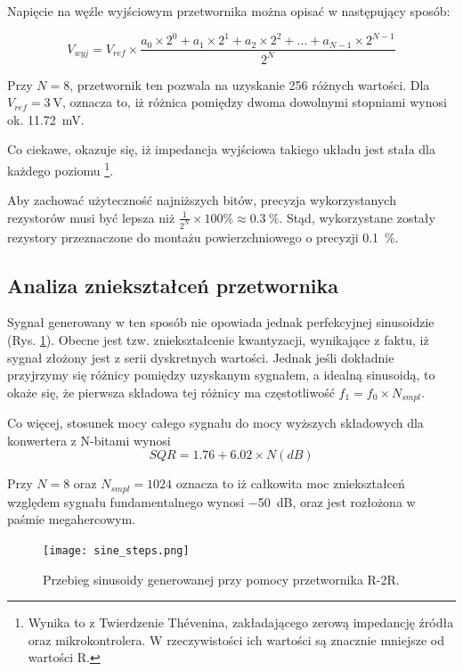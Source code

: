 \documentclass[12pt, a4paper]{article}
\begin{document}
Napięcie na węźle wyjściowym przetwornika można opisać w następujący sposób:

\[
	V_{wyj}=V_{ref} \times \frac{a_0 \times 2^0 + a_1 \times 2^1 + a_2 \times 2^2 + ... + a_{N - 1} \times 2^{N- 1}}{2^N}
\]

Przy $N=8$, przetwornik ten pozwala na uzyskanie 256 różnych wartości. Dla $V_{ref}=\qty{3}{\volt}$,
oznacza to, iż różnica pomiędzy dwoma dowolnymi stopniami wynosi ok. \qty{11,72}{\mV}.

Co ciekawe, okazuje się, iż impedancja wyjściowa takiego układu jest stała dla każdego poziomu
\footnote{
	Wynika to z Twierdzenie Thévenina, zakładającego zerową impedancję źródła oraz mikrokontrolera. 
	W rzeczywistości ich wartości są znacznie mniejsze od wartości R.
}.

Aby zachować użyteczność najniższych bitów, precyzja wykorzystanych rezystorów musi być lepsza niż
$\frac{1}{2^N} \times 100\unit{\percent} \approx \qty{0,3}{\%}$. Stąd, wykorzystane zostały
rezystory przeznaczone do montażu powierzchniowego o precyzji \qty{0,1}{\%}.

\subsection{Analiza zniekształceń przetwornika}

Sygnał generowany w ten sposób nie opowiada jednak perfekcyjnej sinusoidzie (Rys. \ref{fig:sine-stepped}).
Obecne jest tzw. zniekształcenie kwantyzacji, wynikające z faktu, iż sygnał złożony jest 
z serii dyskretnych wartości. Jednak jeśli dokładnie przyjrzymy się różnicy pomiędzy uzyskanym sygnałem,
a idealną sinusoidą, to okaże się, że pierwsza składowa tej różnicy ma częstotliwość $f_1 = f_0 \times N_{smpl}$.

Co więcej, stosunek mocy całego sygnału do mocy wyższych składowych dla konwertera z N-bitami wynosi
\begin{equation}
	SQR = 1.76 + 6.02 \times N (dB)
\end{equation}

Przy $N=8$ oraz $N_{smpl}=1024$ oznacza to iż całkowita moc zniekształceń względem sygnału fundamentalnego wynosi \qty{-50}{\dB}, 
oraz jest rozłożona w paśmie megahercowym.

\begin{figure}[h]
	\centering
	\texttt{[image: sine\_steps.png]}
	\caption{Przebieg sinusoidy generowanej przy pomocy przetwornika R-2R.}
	\label{fig:sine-stepped}
\end{figure}
\end{document}
